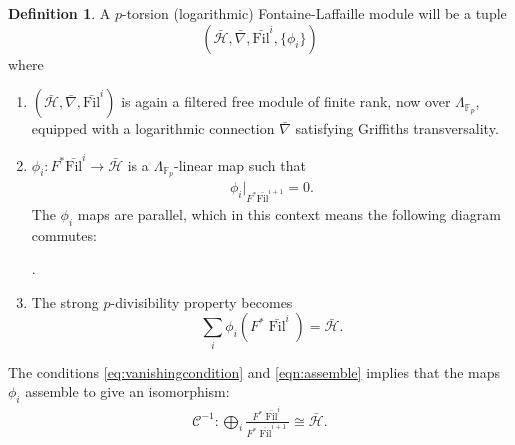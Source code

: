 \documentclass[reqno]{amsart}
\numberwithin{equation}{section}
\numberwithin{equation}{section}
\numberwithin{equation}{section}
\theoremstyle{definition}
\newtheorem{defn}[thm]{Definition}
\theoremstyle{remark}
\theoremstyle{remark}
\begin{document}
\begin{defn}\label{defn:ptorsion_fontaine} A $p$-torsion (logarithmic) Fontaine-Laffaille module will be a tuple $$(\bar{\mathcal{H}}, \bar{\nabla}, \bar{\mathrm{Fil}}^i, \lbrace \phi_i\rbrace)$$ where
\begin{enumerate}
    \item $(\bar{\mathcal{H}}, \bar{\nabla}, \bar{\mathrm{Fil}}^i)$ is again a filtered free module of finite rank, now over $\Lambda_{\mathbb{F}_p}$, equipped with a logarithmic connection $\bar{\nabla}$ satisfying Griffiths transversality.
 \item $\phi_i : F^*\bar{\mathrm{Fil}}^i \to \bar{\mathcal{H}}$ is a $\Lambda_{\mathbb{F}_p}$-linear map such that
 \begin{align}\label{eq:vanishingcondition} \phi_i|_{F^*\bar{\mathrm{Fil}}^{i+1}} = 0. \end{align}
   The  $\phi_i$ maps are parallel, which in this context means the following diagram commutes:

\begin{center}
\end{center}.
    \item The strong $p$-divisibility property becomes
    \begin{equation}\label{eqn:assemble}
    \sum_{i} \phi_i(F^*\bar{\operatorname{Fil}}^i) = \bar{\mathcal{H}}.
    \end{equation}
\end{enumerate}
\end{defn}

The conditions \eqref{eq:vanishingcondition} and \eqref{eqn:assemble} implies that the maps $\phi_i$ assemble to give an isomorphism: \begin{align} \label{eq:inversecartiergeneral} \mathcal{C}^{-1}: \bigoplus_i \frac{F^*\bar{\operatorname{Fil}}^i}{F^*\bar{\operatorname{Fil}}^{i+1}} \cong \bar{\mathcal{H}}. \end{align}
\end{document}
